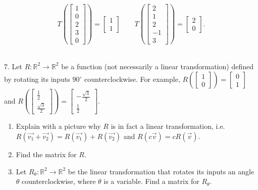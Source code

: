 \documentclass{article}
\begin{document}
$$
	T\left(\left[\begin{array}{c} 1 \\ 0 \\ 2 \\ 3 \\ 0 \end{array}\right]\right) = \left[\begin{array}{c} 1 \\ 1 \end{array}\right] \qquad T\left(\left[\begin{array}{c} 2 \\ 1 \\ 2 \\ -1 \\ 3 \end{array}\right]\right) = \left[\begin{array}{c} 2 \\ 0 \end{array}\right].
$$

~\\

7. Let $R : \mathbb{R}^2 \to \mathbb{R}^2$ be a function (not necessarily a linear transformation) defined by rotating its inputs $90^\circ$ counterclockwise. For example, $R\left( \left[\begin{array}{c} 1 \\ 0 \end{array}\right] \right) = \left[\begin{array}{c} 0 \\ 1 \end{array}\right]$ and $R\left( \left[\begin{array}{c} \frac{1}{2} \\ \frac{\sqrt{3}}{2} \end{array}\right] \right) = \left[\begin{array}{c} -\frac{\sqrt{3}}{2} \\ \frac{1}{2} \end{array}\right]$.

\begin{enumerate}

	\item Explain with a picture why $R$ is in fact a linear transformation, i.e. $R(\vec{v_1} + \vec{v_2}) = R(\vec{v_1}) + R(\vec{v_2})$ and $R(c\vec{v}) = cR(\vec{v})$.

	\item Find the matrix for $R$.

	\item Let $R_\theta : \mathbb{R}^2 \to \mathbb{R}^2$ be the linear transformation that rotates its inputs an angle $\theta$ counterclockwise, where $\theta$ is a variable. Find a matrix for $R_\theta$.

\end{enumerate}
\end{document}
